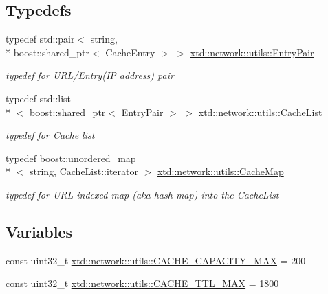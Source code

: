 \subsection*{Typedefs}
\begin{DoxyCompactItemize}
\item 
typedef std\-::pair$<$ string, \\*
boost\-::shared\-\_\-ptr$<$ Cache\-Entry $>$ $>$ \hyperlink{namespacextd_1_1network_1_1utils_a1118a93e3ee4c3aba74b90600794145b}{xtd\-::network\-::utils\-::\-Entry\-Pair}
\begin{DoxyCompactList}\small\item\em typedef for U\-R\-L/\-Entry(I\-P address) pair \end{DoxyCompactList}\item 
typedef std\-::list\\*
$<$ boost\-::shared\-\_\-ptr$<$ Entry\-Pair $>$ $>$ \hyperlink{namespacextd_1_1network_1_1utils_a6eef494cdc6ca2b10bf4f36f6fa110ee}{xtd\-::network\-::utils\-::\-Cache\-List}
\begin{DoxyCompactList}\small\item\em typedef for Cache list \end{DoxyCompactList}\item 
typedef boost\-::unordered\-\_\-map\\*
$<$ string, Cache\-List\-::iterator $>$ \hyperlink{namespacextd_1_1network_1_1utils_aa648e4975dce81f2fd0a9999f684781d}{xtd\-::network\-::utils\-::\-Cache\-Map}
\begin{DoxyCompactList}\small\item\em typedef for U\-R\-L-\/indexed map (aka hash map) into the Cache\-List \end{DoxyCompactList}\end{DoxyCompactItemize}
\subsection*{Variables}
\begin{DoxyCompactItemize}
\item 
const uint32\-\_\-t \hyperlink{namespacextd_1_1network_1_1utils_a8939e806c4a6bc08b78a32941db7a130}{xtd\-::network\-::utils\-::\-C\-A\-C\-H\-E\-\_\-\-C\-A\-P\-A\-C\-I\-T\-Y\-\_\-\-M\-A\-X} = 200
\item 
const uint32\-\_\-t \hyperlink{namespacextd_1_1network_1_1utils_adb4767541db3a79016a24142db705161}{xtd\-::network\-::utils\-::\-C\-A\-C\-H\-E\-\_\-\-T\-T\-L\-\_\-\-M\-A\-X} = 1800
\end{DoxyCompactItemize}

